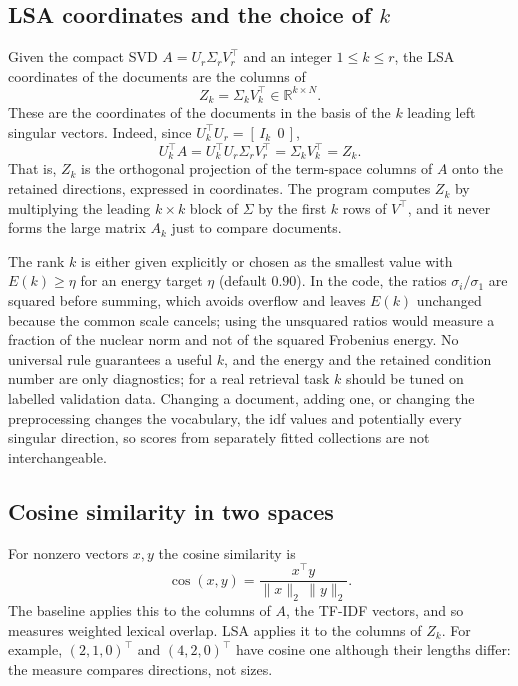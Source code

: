 \documentclass[12pt,a4paper]{report}
\newcommand{\R}{\mathbb{R}}
\newcommand{\norm}[1]{\lVert #1\rVert}
\newcommand{\T}{^{\top}}
\theoremstyle{plain}
\theoremstyle{definition}
\theoremstyle{remark}
\theoremstyle{definition}
\begin{document}
\subsection{LSA coordinates and the choice of \texorpdfstring{$k$}{k}}

Given the compact SVD $A=U_r\Sigma_rV_r\T$ and an integer $1\le k\le r$, the LSA coordinates of the documents are the columns of
\begin{equation}\label{eq:Z}
Z_k=\Sigma_kV_k\T\in\R^{k\times N}.
\end{equation}
These are the coordinates of the documents in the basis of the $k$ leading left singular vectors. Indeed, since $U_k\T U_r=[\,I_k\ \ 0\,]$,
\[
U_k\T A=U_k\T U_r\Sigma_rV_r\T=\Sigma_kV_k\T=Z_k .
\]
That is, $Z_k$ is the orthogonal projection of the term-space columns of $A$ onto the retained directions, expressed in coordinates. The program computes $Z_k$ by multiplying the leading $k\times k$ block of $\Sigma$ by the first $k$ rows of $V\T$, and it never forms the large matrix $A_k$ just to compare documents.

The rank $k$ is either given explicitly or chosen as the smallest value with $E(k)\ge\eta$ for an energy target $\eta$ (default $0.90$). In the code, the ratios $\sigma_i/\sigma_1$ are squared before summing, which avoids overflow and leaves $E(k)$ unchanged because the common scale cancels; using the unsquared ratios would measure a fraction of the nuclear norm and not of the squared Frobenius energy. No universal rule guarantees a useful $k$, and the energy and the retained condition number are only diagnostics; for a real retrieval task $k$ should be tuned on labelled validation data. Changing a document, adding one, or changing the preprocessing changes the vocabulary, the idf values and potentially every singular direction, so scores from separately fitted collections are not interchangeable.

\subsection{Cosine similarity in two spaces}

For nonzero vectors $x,y$ the cosine similarity is
\[
\cos(x,y)=\frac{x\T y}{\norm{x}_2\,\norm{y}_2}.
\]
The baseline applies this to the columns of $A$, the TF-IDF vectors, and so measures weighted lexical overlap. LSA applies it to the columns of $Z_k$. For example, $(2,1,0)\T$ and $(4,2,0)\T$ have cosine one although their lengths differ: the measure compares directions, not sizes.
\end{document}
